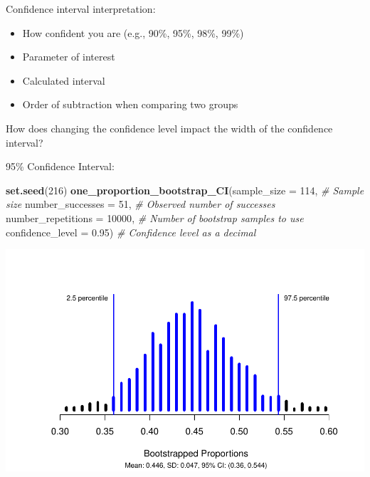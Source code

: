 \documentclass[
]{report}
\newenvironment{Shaded}{\begin{snugshade}}{\end{snugshade}}
\newcommand{\AttributeTok}[1]{\textcolor[rgb]{0.13,0.29,0.53}{#1}}
\newcommand{\CommentTok}[1]{\textcolor[rgb]{0.56,0.35,0.01}{\textit{#1}}}
\newcommand{\DecValTok}[1]{\textcolor[rgb]{0.00,0.00,0.81}{#1}}
\newcommand{\FloatTok}[1]{\textcolor[rgb]{0.00,0.00,0.81}{#1}}
\newcommand{\FunctionTok}[1]{\textcolor[rgb]{0.13,0.29,0.53}{\textbf{#1}}}
\newcommand{\NormalTok}[1]{#1}
\begin{document}
Confidence interval interpretation:

\begin{itemize}
\item
  How confident you are (e.g., 90\%, 95\%, 98\%, 99\%)
\item
  Parameter of interest
\item
  Calculated interval
\item
  Order of subtraction when comparing two groups
\end{itemize}

\vspace{0.8in}

\newpage

How does changing the confidence level impact the width of the confidence interval?

95\% Confidence Interval:

\begin{Shaded}
\begin{Highlighting}[]
\FunctionTok{set.seed}\NormalTok{(}\DecValTok{216}\NormalTok{)}
\FunctionTok{one\_proportion\_bootstrap\_CI}\NormalTok{(}\AttributeTok{sample\_size =} \DecValTok{114}\NormalTok{, }\CommentTok{\# Sample size}
                    \AttributeTok{number\_successes =} \DecValTok{51}\NormalTok{, }\CommentTok{\# Observed number of successes}
                    \AttributeTok{number\_repetitions =} \DecValTok{10000}\NormalTok{, }\CommentTok{\# Number of bootstrap samples to use}
                    \AttributeTok{confidence\_level =} \FloatTok{0.95}\NormalTok{) }\CommentTok{\# Confidence level as a decimal}
\end{Highlighting}
\end{Shaded}

\begin{center}\includegraphics[width=0.7\linewidth]{03-VN03-EDA_OneCatSimulation_files/figure-latex/unnamed-chunk-10-1} \end{center}
\end{document}
